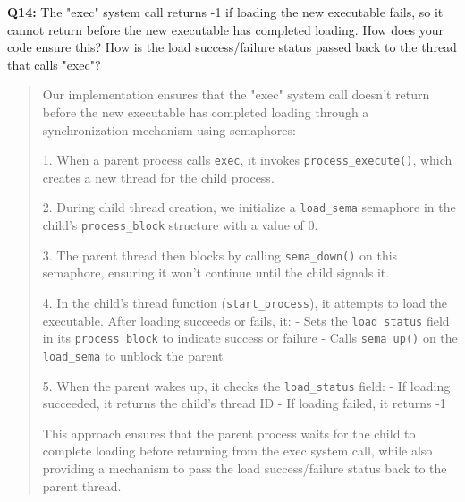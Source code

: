 \documentclass[a4paper,11pt]{paper}
\begin{document}
\textbf{Q14:} The "exec" system call returns -1 if loading the new executable fails, so it cannot return before the new executable has completed loading.  How does your code ensure this?  How is the load success/failure status passed back to the thread that calls "exec"?
\begin{quote}
Our implementation ensures that the "exec" system call doesn't return before the new executable has completed loading through a synchronization mechanism using semaphores:

1. When a parent process calls \texttt{exec}, it invokes \texttt{process\_execute()}, which creates a new thread for the child process.

2. During child thread creation, we initialize a \texttt{load\_sema} semaphore in the child's \texttt{process\_block} structure with a value of 0.

3. The parent thread then blocks by calling \texttt{sema\_down()} on this semaphore, ensuring it won't continue until the child signals it.

4. In the child's thread function (\texttt{start\_process}), it attempts to load the executable. After loading succeeds or fails, it:
   - Sets the \texttt{load\_status} field in its \texttt{process\_block} to indicate success or failure
   - Calls \texttt{sema\_up()} on the \texttt{load\_sema} to unblock the parent

5. When the parent wakes up, it checks the \texttt{load\_status} field:
   - If loading succeeded, it returns the child's thread ID
   - If loading failed, it returns -1

This approach ensures that the parent process waits for the child to complete loading before returning from the exec system call, while also providing a mechanism to pass the load success/failure status back to the parent thread.
\end{quote}
\end{document}
